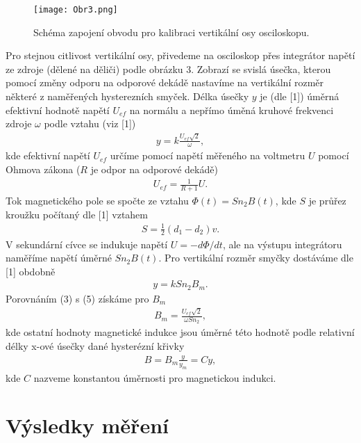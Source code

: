 \documentclass{article}
\begin{document}
\begin{figure}[h!]
\centering
\texttt{[image: Obr3.png]}
\caption{Schéma zapojení obvodu pro kalibraci vertikální osy osciloskopu.}
\end{figure}
\par Pro stejnou citlivost vertikální osy, přivedeme na osciloskop přes integrátor napětí ze zdroje (dělené na děliči) podle obrázku 3. Zobrazí se svislá úsečka, kterou pomocí změny odporu na odporové dekádě nastavíme na vertikální rozměr některé z naměřených hysterezních smyček. Délka úsečky $y$ je (dle [1]) úměrná efektivní hodnotě napětí $U_{ef}$ na normálu a nepřímo úměná kruhové frekvenci zdroje $\omega$ podle vztahu (viz [1])
\begin{align}
    y = k\frac{U_{ef} \sqrt{2}}{\omega},
\end{align}
kde efektivní napětí $U_{ef}$ určíme pomocí napětí měřeného na voltmetru $U$ pomocí Ohmova zákona ($R$ je odpor na odporové dekádě)
\begin{align}
    U_{ef} = \frac{1}{R+1}U.
\end{align}
Tok magnetického pole se spočte ze vztahu $\Phi(t) = Sn_2B(t)$, kde $S$ je průřez kroužku počítaný dle [1] vztahem
\begin{align}
    S = \frac{1}{2}(d_1 - d_2)v.
\end{align}
V sekundární cívce se indukuje napětí $U = -d\Phi/dt$, ale na výstupu integrátoru naměříme napětí úměrné $Sn_2B(t)$. Pro vertikální rozměr smyčky dostáváme dle [1] obdobně
\begin{align}
    y = kSn_2B_m.
\end{align}
Porovnáním (3) s (5) získáme pro $B_m$
\begin{align}
    B_m = \frac{U_{ef}\sqrt{2}}{\omega S n_2},
\end{align}
kde ostatní hodnoty magnetické indukce jsou úměrné této hodnotě podle relativní délky x-ové úsečky dané hysterézní křivky
\begin{align}
    B = B_m \frac{y}{y_m} = Cy,
\end{align}{}
kde $C$ nazveme konstantou úměrnosti pro magnetickou indukci.





\section{Výsledky měření}
\end{document}
